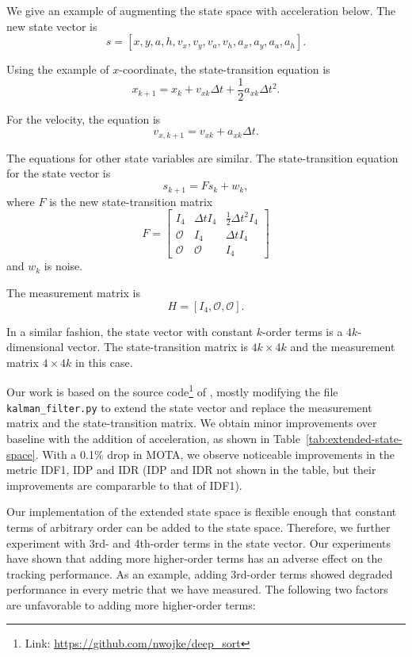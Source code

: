 \documentclass[conference]{IEEEtran}
\begin{document}
We give an example of augmenting the state space with acceleration below. The new state vector is
\[
    s = [x, y, a, h, v_x, v_y, v_a, v_h, a_x, a_y, a_a, a_h].
\]

Using the example of $x$-coordinate, the state-transition equation is
\[
    x_{k + 1} = x_k + v_{xk} \Delta t + \frac{1}{2} a_{xk} \Delta t^2.
\]

For the velocity, the equation is
\[
    v_{x, k + 1} = v_{xk} + a_{xk} \Delta t.
\]

The equations for other state variables are similar. The state-transition equation for the state vector is
\[
    s_{k + 1} = Fs_k + w_k,
\]
where $F$ is the new state-transition matrix
\[
    F = \begin{bmatrix}
        I_4 & \Delta t I_4 & \frac{1}{2} \Delta t^2 I_4\\
        \mathcal{O} & I_4 & \Delta t I_4\\
        \mathcal{O} & \mathcal{O} & I_4
    \end{bmatrix}
\]
and $w_k$ is noise.

The measurement matrix is
\[
    H = [I_4, \mathcal{O}, \mathcal{O}].
\]

In a similar fashion, the state vector with constant $k$-order terms is a $4k$-dimensional vector. The state-transition matrix is $4k \times 4k$ and the measurement matrix $4 \times 4k$ in this case.

Our work is based on the source code\footnote{Link: \url{https://github.com/nwojke/deep_sort}} of \cite{Wojke2018deep}, mostly modifying the file \texttt{kalman\_filter.py} to extend the state vector and replace the measurement matrix and the state-transition matrix. We obtain minor improvements over baseline with the addition of acceleration, as shown in Table~\ref{tab:extended-state-space}. With a 0.1\% drop in MOTA, we observe noticeable improvements in the metric IDF1, IDP and IDR (IDP and IDR not shown in the table, but their improvements are compararble to that of IDF1).

Our implementation of the extended state space is flexible enough that constant terms of arbitrary order can be added to the state space. Therefore, we further experiment with 3rd- and 4th-order terms in the state vector. Our experiments have shown that adding more higher-order terms has an adverse effect on the tracking performance. As an example, adding 3rd-order terms showed degraded performance in every metric that we have measured. The following two factors are unfavorable to adding more higher-order terms:
\end{document}

